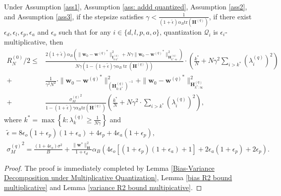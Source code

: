 \documentclass[11pt, letterpaper]{article}
\begin{document}
\begin{lemma}
    \label{R_2 bound multi}
    Under Assumption \ref{ass1}, Assumption \ref{ass: addd quantized}, Assumption \ref{ass2}, and Assumption \ref{ass3}, if the stepsize satisfies $\gamma < \frac{1}{(1+\tilde{\epsilon})\alpha_B\mathrm{tr}(\mathbf{H}^{(q)})}$, if there exist $\epsilon_d,\epsilon_l,\epsilon_p,\epsilon_a$ and $\epsilon_o$ such that for any $i\in \{d,l,p,a,o\}$, quantization $\mathcal{Q}_i$ is $\epsilon_i$-multiplicative, then
    \begin{equation*}
        \begin{aligned}
            R_N^{(0)}/2\leq & \frac{2(1+\tilde{\epsilon})\alpha_B\left(\|\mathbf{w}_0-{\mathbf{w}^{(q)}}^*\|_{\mathbf{I}_{0:k^*}^{(q)}}^2+N\gamma\|\mathbf{w}_0-{\mathbf{w}^{(q)}}^*\|_{\mathbf{H}_{k^*:\infty}^{(q)}}^2\right)}{N\gamma(1-(1+\tilde{\epsilon})\gamma\alpha_B\operatorname{tr}(\mathbf{H}^{(q)}))}\cdot\left(\frac{k^*}{N}+N\gamma^2\sum_{i>k^*}(\lambda_i^{(q)})^2\right)\\
            +& \frac{1}{\gamma^2N^2}\cdot\|\mathbf{w}_0-{\mathbf{w}^{(q)}}^*\|_{(\mathbf{H}_{0:k^*}^{(q)})^{-1}}^2+\|\mathbf{w}_0-{\mathbf{w}^{(q)}}^*\|_{\mathbf{H}_{k^*:\infty}^{(q)}}^2\\
            +&\frac{{\sigma_M^{(q)}}^2}{1-(1+\tilde{\epsilon})\gamma\alpha_B\mathrm{tr}(\mathbf{H}^{(q)})}\left(\frac{k^*}{N}+N\gamma^2\cdot\sum_{i>k^*}(\lambda_i^{(q)})^2\right),
        \end{aligned}
    \end{equation*}
    where $k^*=\max\left\{k: \lambda_k^{(q)} \geq \frac{1}{N\gamma}\right\}$ and
    \begin{gather*}
        \tilde{\epsilon}=8\epsilon_o(1+\epsilon_p)(1+\epsilon_a)+4\epsilon_p+4\epsilon_a(1+\epsilon_p),\\
        {\sigma_M^{(q)}}^2=\frac{(1+4\epsilon_o)\sigma^2}{B} + \frac{\|\mathbf{w}^*\|_\mathbf{H}^2}{1+\epsilon_d}\alpha_B\left(4\epsilon_o[(1+\epsilon_p)(1+\epsilon_a)+1]+2\epsilon_a(1+\epsilon_p)+2\epsilon_p \right).
    \end{gather*}
\end{lemma}
\begin{proof}
    The proof is immediately completed by Lemma \ref{Bias-Variance Decomposition under Multiplicative Quantization}, Lemma \ref{bias R2 bound multiplicative} and Lemma \ref{variance R2 bound multipicative}.
\end{proof}
\end{document}
